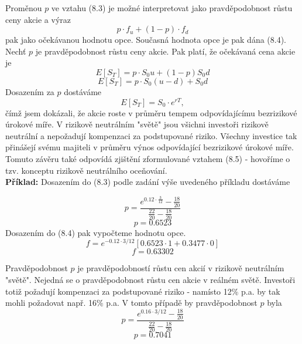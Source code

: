 \documentclass[a4paper]{book}
\begin{document}
Proměnou $p$ ve vztahu (8.3) je možné interpretovat jako pravděpodobnost růstu ceny akcie a výraz
\begin{equation*}
p \cdot f_u + (1-p) \cdot f_d
\end{equation*}
pak jako očekávanou hodnotu opce. Současná hodnota opce je pak dána (8.4).\\

Nechť $p$ je pravděpodobnost růstu ceny akcie. Pak platí, že očekávaná cena akcie je
\begin{equation*}
E[S_T] = p \cdot S_0u + (1-p)S_0d
\end{equation*}
\begin{equation*}
E[S_T] = p \cdot S_0(u-d) + S_0d
\end{equation*}
Dosazením za $p$ dostáváme
\begin{equation}
E[S_T] = S_0 \cdot e^{rT},
\end{equation}
čímž jsem dokázali, že akcie roste v průměru tempem odpovídajícímu bezrizikové úrokové míře.
V rizikově neutrálním "světě" jsou všichni investoři rizikově neutrální a nepožadují kompenzaci za podstupované riziko. Všechny investice tak přinášejí svému majiteli v průměru výnos odpovídající bezrizikové úrokové míře. Tomuto závěru také odpovídá zjištění zformulované vztahem (8.5) - hovoříme o tzv. konceptu rizikově neutrálního oceňování.\\

\noindent \textbf{Příklad:} Dosazením do (8.3) podle zadání výše uvedeného příkladu dostáváme

\begin{equation*}
p = \frac{e^{0.12 \cdot \frac{3}{12}} - \frac{18}{20}}{\frac{22}{20} - \frac{18}{20}}
\end{equation*}
\begin{equation*}
p = 0.6523
\end{equation*}
Dosazením do (8.4) pak vypočteme hodnotu opce.
\begin{equation*}
f= e^{-0.12 \cdot 3/12}[0.6523 \cdot 1 + 0.3477 \cdot 0]
\end{equation*}
\begin{equation*}
f = 0.63302
\end{equation*}

Pravděpodobnost $p$ je pravděpodobností růstu cen akcií v rizikově neutrálním "světě". Nejedná se o pravděpodobnost růstu cen akcie v reálném světě. Investoři totiž požadují kompenzaci za podstupované riziko - namísto 12\% p.a. by tak mohli požadovat např. 16\% p.a. V tomto případě by pravděpodobnost $p$ byla
\begin{equation*}
p = \frac{e^{0.16 \cdot 3/12} - \frac{18}{20}}{\frac{22}{20} - \frac{18}{20}}
\end{equation*}
\begin{equation*}
p = 0.7041
\end{equation*}
\end{document}
